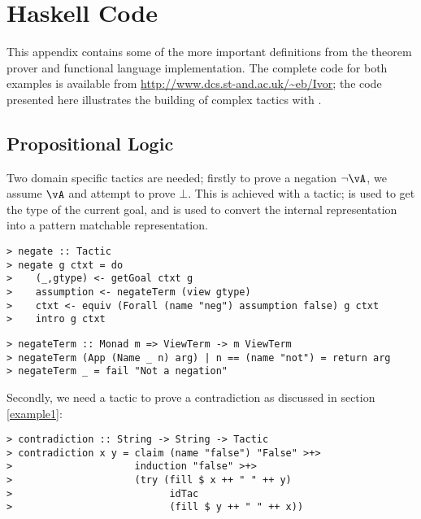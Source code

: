 \section{Haskell Code}

This appendix contains some of the more important definitions from the theorem
prover and functional language implementation. The complete code for
both examples is available from
\url{http://www.dcs.st-and.ac.uk/~eb/Ivor}; the code presented here
illustrates the building of complex tactics with \Ivor{}.

\subsection{Propositional Logic}

Two domain specific tactics are needed; firstly to prove a negation
$\neg\vA$, we assume $\vA$ and attempt to prove $\bot$. This is
achieved with a  tactic;  is used to get
the type of the current goal, and  is used to convert the
internal representation into a pattern matchable representation.

\begin{verbatim}
> negate :: Tactic
> negate g ctxt = do 
>    (_,gtype) <- getGoal ctxt g
>    assumption <- negateTerm (view gtype)
>    ctxt <- equiv (Forall (name "neg") assumption false) g ctxt
>    intro g ctxt
\end{verbatim}

\begin{verbatim}
> negateTerm :: Monad m => ViewTerm -> m ViewTerm
> negateTerm (App (Name _ n) arg) | n == (name "not") = return arg
> negateTerm _ = fail "Not a negation"
\end{verbatim}

Secondly, we need a tactic to prove a contradiction as discussed in
section \ref{example1}:

\begin{verbatim}
> contradiction :: String -> String -> Tactic
> contradiction x y = claim (name "false") "False" >+>
>                     induction "false" >+>
>                     (try (fill $ x ++ " " ++ y)
>                           idTac
>                           (fill $ y ++ " " ++ x))
\end{verbatim}

\subsection{\Funl{}}

